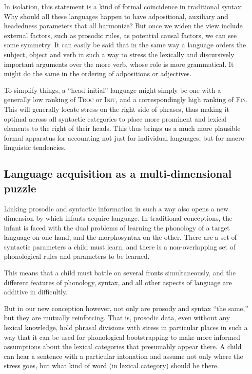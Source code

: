 \documentclass{article}
\newcommand{\finphi}{\textsc{Fin\textphi}}
\newcommand{\initphi}{\textsc{Init\textphi}}
\newcommand{\troc}{\textsc{Troc}}
\begin{document}
In isolation, this statement is a kind of formal coincidence in traditional syntax: Why should all these languages happen to have adpositional, auxiliary and headedness parameters that all harmonize? But once we widen the view include external factors, such as prosodic rules, as potential causal factors, we can see some symmetry.
It can easily be said that in the same way a language orders the subject, object and verb in such a way to stress the lexically and discursively important arguments over the more verb, whose role is more grammatical.
It might do the same in the ordering of adpositions or adjectives.

To simplify things, a ``head-initial'' language might simply be one with a generally low ranking of {\troc} or {\initphi}, and a correspondingly high ranking of {\finphi}.
This will generally locate stress on the right side of phrases, thus making it optimal across all syntactic categories to place more prominent and lexical elements to the right of their heads.
This thus brings us a much more plausible formal apparatus for accounting not just for individual languages, but for macro-linguistic tendencies.

\subsection{Language acquisition as a multi-dimensional puzzle}

Linking prosodic and syntactic information in such a way also opens a new dimension by which infants acquire language.
In traditional conceptions, the infant is faced with the dual problems of learning the phonology of a target language on one hand, and the morphosyntax on the other.
There are a set of syntactic parameters a child must learn, and there is a non-overlapping set of phonological rules and parameters to be learned.

This means that a child must battle on several fronts simultaneously, and the different features of phonology, syntax, and all other aspects of language are additive in difficultly.

But in our new conception however, not only are prosody and syntax ``the same,'' but they are mutually reinforcing.
That is, prosodic data, even without any lexical knowledge, hold phrasal divisions with stress in particular places in such a way that it can be used for phonological bootstrapping to make more informed assumptions about the lexical categories that presumably appear there.
A child can hear a sentence with a particular intonation and assume not only where the stress goes, but what kind of word (in lexical category) should be there.
\end{document}
